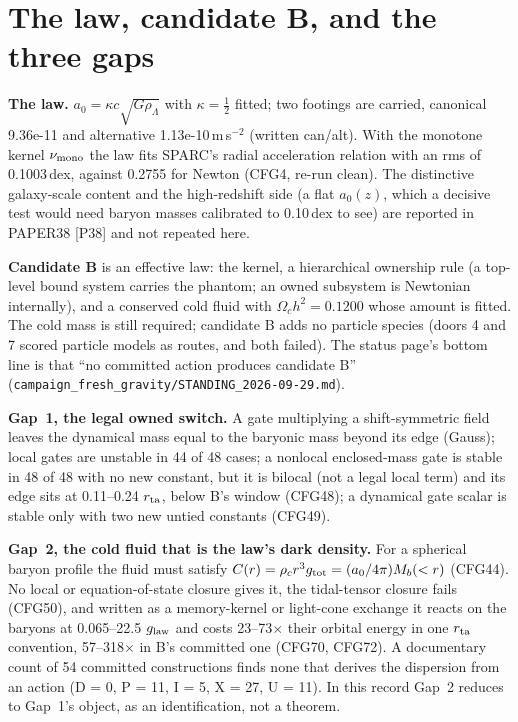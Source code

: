 \documentclass[10pt]{article}
\newcommand{\fpath}[1]{\nolinkurl{#1}}
\begin{document}

\section{The law, candidate B, and the three gaps}\label{sec:law}

\textbf{The law.} $a_0=\kappa c\sqrt{G\rho_\Lambda}$ with $\kappa=\tfrac12$ fitted; two footings are carried, canonical 9.36e-11 and alternative 1.13e-10\,m\,s$^{-2}$ (written can/alt). With the monotone kernel $\nu_{\rm mono}$ the law fits SPARC's radial acceleration relation with an rms of 0.1003\,dex, against 0.2755 for Newton (CFG4, re-run clean). The distinctive galaxy-scale content and the high-redshift side (a flat $a_0(z)$, which a decisive test would need baryon masses calibrated to 0.10\,dex to see) are reported in PAPER38 [P38] and not repeated here.

\textbf{Candidate B} is an effective law: the kernel, a hierarchical ownership rule (a top-level bound system carries the phantom; an owned subsystem is Newtonian internally), and a conserved cold fluid with $\Omega_ch^2=0.1200$ whose amount is fitted. The cold mass is still required; candidate B adds no particle species (doors 4 and 7 scored particle models as routes, and both failed). The status page's bottom line is that ``no committed action produces candidate B'' (\fpath{campaign_fresh_gravity/STANDING_2026-09-29.md}).

\textbf{Gap~1, the legal owned switch.} A gate multiplying a shift-symmetric field leaves the dynamical mass equal to the baryonic mass beyond its edge (Gauss); local gates are unstable in 44 of 48 cases; a nonlocal enclosed-mass gate is stable in 48 of 48 with no new constant, but it is bilocal (not a legal local term) and its edge sits at 0.11--0.24 $r_{\rm ta}$, below B's window (CFG48); a dynamical gate scalar is stable only with two new untied constants (CFG49).

\textbf{Gap~2, the cold fluid that is the law's dark density.} For a spherical baryon profile the fluid must satisfy $C(r)=\rho_c r^3 g_{\rm tot}=(a_0/4\pi)M_b(<r)$ (CFG44). No local or equation-of-state closure gives it, the tidal-tensor closure fails (CFG50), and written as a memory-kernel or light-cone exchange it reacts on the baryons at 0.065--22.5 $g_{\rm law}$ and costs 23--73$\times$ their orbital energy in one $r_{\rm ta}$ convention, 57--318$\times$ in B's committed one (CFG70, CFG72). A documentary count of 54 committed constructions finds none that derives the dispersion from an action (D = 0, P = 11, I = 5, X = 27, U = 11). In this record Gap~2 reduces to Gap~1's object, as an identification, not a theorem.
\end{document}
